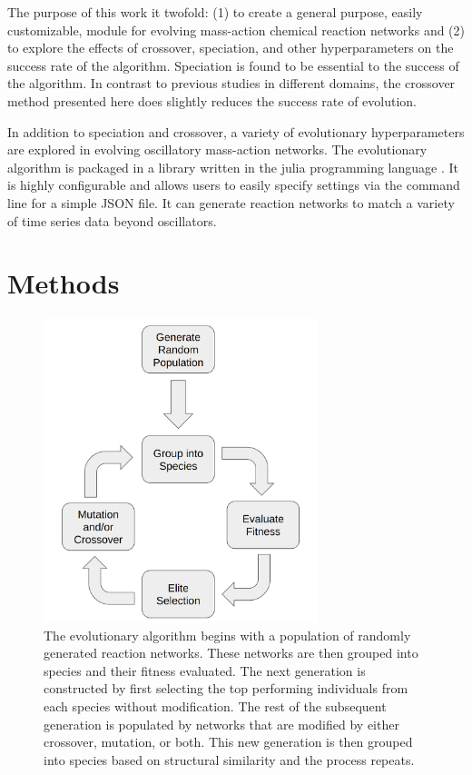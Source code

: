 \documentclass[12pt]{report}
\begin{document}
The purpose of this work it twofold: (1) to create a general purpose, easily customizable, module for evolving mass-action chemical reaction networks and (2) to explore the effects of crossover, speciation, and other hyperparameters on the success rate of the algorithm. Speciation is found to be essential to the success of the algorithm. In contrast to previous studies in different domains, the crossover method presented here does slightly reduces the success rate of evolution. 

In addition to speciation and crossover, a variety of evolutionary hyperparameters are explored in evolving oscillatory mass-action networks. The evolutionary algorithm is packaged in a library written in the julia programming language \cite{bezanson2017julia}. It is highly configurable and allows users to easily specify settings via the command line for a simple JSON file. It can generate reaction networks to match a variety of time series data beyond oscillators.



\section{Methods}

\begin{figure}
\centering
    \includegraphics[width=8cm]{images/algo_description_crossover.png}
    \caption[Overview of the evolution algorithm with speciation]{The evolutionary algorithm begins with a population of randomly generated reaction networks. These networks are then grouped into species and their fitness evaluated. The next generation is constructed by first selecting the top performing individuals from each species without modification. The rest of the subsequent generation is populated by networks that are modified by either crossover, mutation, or both. This new generation is then grouped into species based on structural similarity and the process repeats.}
    \label{fig:algo_description_crossover}
\end{figure}
\end{document}
